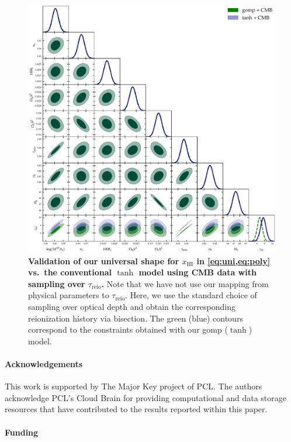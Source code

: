 \documentclass[12pt, a4paper]{article}
\newcommand{\HI}{\mathrm{HI}}
\newcommand{\reio}{\mathrm{reio}}
\begin{document}
\begin{figure}
\centering
\includegraphics[width=\linewidth]{figs/gomp_tanh_triangle_tau.pdf}
\caption{\textbf{\boldmath Validation of our universal shape for $x_\HI$
in \cref{eq:uni,eq:poly} vs.\ the conventional $\tanh$ model using CMB
data with sampling over $\tau_\reio$.}
Note that we have not use our mapping from physical parameters to
$\tau_\reio$.
Here, we use the standard choice of sampling over optical depth and
obtain the corresponding reionization history via bisection.
The green (blue) contours correspond to the constraints obtained with
our gomp ($\tanh$) model.}
\label{fig:tg}
\end{figure}

\FloatBarrier



\paragraph{\large Acknowledgements}

This work is supported by The Major Key project of PCL.
The authors acknowledge PCL's Cloud Brain for providing computational
and data storage resources that have contributed to the results reported
within this paper.


\paragraph{\large Funding}
\end{document}
